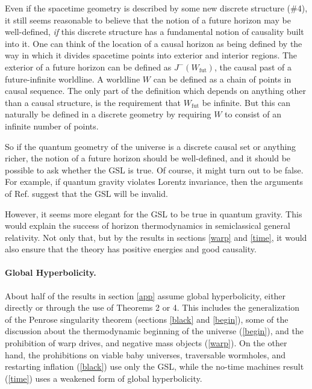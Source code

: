 \documentclass{article}
\begin{document}
Even if the spacetime geometry is described by some new discrete structure (\#4), it still seems reasonable to believe that the notion of a future horizon may be well-defined, \emph{if} this discrete structure has a fundamental notion of causality built into it.  One can think of the location of a causal horizon as being defined by the way in which it divides spacetime points into exterior and interior regions.  The exterior of a future horizon can be defined as $J^-(W_\mathrm{fut})$, the causal past of a future-infinite worldline.  A worldline $W$ can be defined as a chain of points in causal sequence.  The only part of the definition which depends on anything other than a causal structure, is the requirement that $W_\mathrm{fut}$ be infinite.  But this can naturally be defined in a discrete geometry by requiring $W$ to consist of an infinite number of points.

So if the quantum geometry of the universe is a discrete causal set or anything richer, the notion of a future horizon should be well-defined, and it should be possible to ask whether the GSL is true.  Of course, it might turn out to be false.  For example, if quantum gravity violates Lorentz invariance, then the arguments of Ref. \cite{2speed} suggest that the GSL will be invalid.

However, it seems more elegant for the GSL to be true in quantum gravity.  This would explain the success of horizon thermodynamics in semiclassical general relativity.  Not only that, but by the results in sections \ref{warp} and \ref{time}, it would also ensure that the theory has positive energies and good causality.

\paragraph{Global Hyperbolicity.}

About half of the results in section \ref{app} assume global hyperbolicity, either directly or through the use of Theorems 2 or 4.  This includes the generalization of the Penrose singularity theorem (sections \ref{black} and \ref{begin}), some of the discussion about the thermodynamic beginning of the universe (\ref{begin}), and the prohibition of warp drives, and negative mass objects (\ref{warp}).  On the other hand, the prohibitions on viable baby universes, traversable wormholes, and restarting inflation (\ref{black}) use only the GSL, while the no-time machines result (\ref{time}) uses a weakened form of global hyperbolicity.
\end{document}
